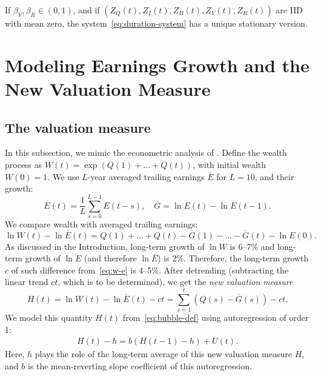 \documentclass[12pt]{amsart}
\begin{document}
\begin{theorem} If $\beta_V, \beta_R \in (0, 1)$, and if $(Z_Q(t), Z_I(t), Z_B(t), Z_V(t), Z_R(t))$ are IID with mean zero, the system~\eqref{eq:duration-system} has a unique stationary version. 
\end{theorem}


\section{Modeling Earnings Growth and the New Valuation Measure}

\subsection{The valuation measure} In this subsection, we mimic the econometric analysis of \cite[Section 2.1]{Valuation}. Define the wealth process as $W(t) = \exp(Q(1) + \ldots + Q(t))$, with initial wealth $W(0) = 1$. We use $L$-year averaged trailing earnings $\overline{E}$ for $L = 10$, and their growth:
\begin{equation}
\label{eq:trailing}
\overline{E}(t) = \frac1L\sum\limits_{s=0}^{L-1}E(t-s),\quad \overline{G} = \ln \overline{E}(t) - \ln\overline{E}(t-1).
\end{equation}
We compare wealth with averaged trailing earnings:
\begin{equation}
\label{eq:w-e}
\ln W(t) - \ln \overline{E}(t) = Q(1) + \ldots + Q(t) - \overline{G}(1) - \ldots - \overline{G}(t) - \ln E(0).
\end{equation}
As discussed in the Introduction, long-term growth of $\ln W$ is 6--7\% and long-term growth of $\ln E$ (and therefore $\ln\overline{E}$) is 2\%. Therefore, the long-term growth $c$ of such difference from~\eqref{eq:w-e} is 4--5\%. After detrending (subtracting the linear trend $ct$, which is to be determined), we get the {\it new valuation measure}
\begin{equation}
\label{eq:bubble-def}
H(t) = \ln W(t) - \ln\overline{E}(t) - ct = \sum\limits_{s=1}^t(Q(s) - \overline{G}(s)) - ct.
\end{equation}
We model this quantity $H(t)$ from~\eqref{eq:bubble-def} using autoregression of order 1:
\begin{align}
\label{eq:bubble-ar}
H(t) - h = b(H(t-1) - h) + U(t).
\end{align}
Here, $h$ plays the role of the long-term average of this new valuation measure $H$, and $b$ is the mean-reverting slope coefficient of this autoregression. 
\end{document}
